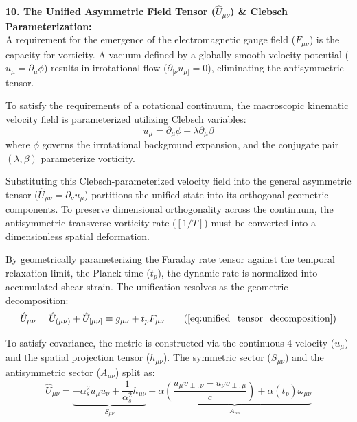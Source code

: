 \vspace{0.2cm}

\textbf{10. The Unified Asymmetric Field Tensor ($\hat{U}_{\mu\nu}$) \& Clebsch Parameterization:} \\
A requirement for the emergence of the electromagnetic gauge field ($F_{\mu\nu}$) is the capacity for vorticity. A vacuum defined by a globally smooth velocity potential ($u_\mu = \partial_\mu \phi$) results in irrotational flow ($\partial_{[\nu} u_{\mu]} = 0$), eliminating the antisymmetric tensor. 

To satisfy the requirements of a rotational continuum, the macroscopic kinematic velocity field is parameterized utilizing Clebsch variables:
\begin{equation}
    u_\mu = \partial_\mu \phi + \lambda \partial_\mu \beta \label{eq:clebsch_velocity}
\end{equation}
where $\phi$ governs the irrotational background expansion, and the conjugate pair $(\lambda, \beta)$ parameterize vorticity.

Substituting this Clebsch-parameterized velocity field into the general asymmetric tensor ($\hat{U}_{\mu\nu} = \partial_\nu u_\mu$) partitions the unified state into its orthogonal geometric components. To preserve dimensional orthogonality across the continuum, the antisymmetric transverse vorticity rate ($[1/T]$) must be converted into a dimensionless spatial deformation. 

By geometrically parameterizing the Faraday rate tensor against the temporal relaxation limit, the Planck time ($t_p$), the dynamic rate is normalized into accumulated shear strain. The unification resolves as the geometric decomposition:
\begin{equation}
    \hat{U}_{\mu\nu} = \hat{U}_{(\mu\nu)} + \hat{U}_{[\mu\nu]} \equiv g_{\mu\nu} + t_p F_{\mu\nu} \tag{\ref{eq:unified_tensor_decomposition}}  
\end{equation}

To satisfy covariance, the metric is constructed via the continuous 4-velocity ($u_\mu$) and the spatial projection tensor ($h_{\mu\nu}$). The symmetric sector ($S_{\mu\nu}$) and the antisymmetric sector ($A_{\mu\nu}$) split as: %
\begin{equation}
    \hat{U}_{\mu\nu} = \underbrace{-\alpha_s^2 u_\mu u_\nu + \frac{1}{\alpha_s^2} h_{\mu\nu}}_{S_{\mu\nu}} + \underbrace{\alpha \left( \frac{u_\mu v_{\perp, \nu} - u_\nu v_{\perp, \mu}}{c} \right) + \alpha(t_p) \omega_{\mu\nu}}_{A_{\mu\nu}} \label{eq:covariant_tensor}
\end{equation}

